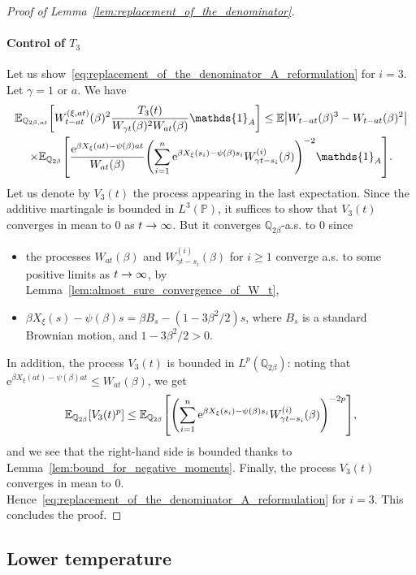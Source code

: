 \documentclass[AHL,Unicode,longabstracts,published]{cedram}
\newcommand{\e}{\mathrm{e}}
\newcommand{\E}{\mathbb{E}}
\renewcommand{\P}{\mathbb{P}}
\newcommand{\Q}{\mathbb{Q}}
\newcommand\1{\mathds{1}}
\let\originalleft\left
\let\originalright\right
\renewcommand{\left}{\mathopen{}\mathclose\bgroup\originalleft}
\renewcommand{\right}{\aftergroup\egroup\originalright}
\renewcommand*{\to}{\mathchoice{\longrightarrow}{\rightarrow}{\rightarrow}{\rightarrow}}
\begin{document}
\begin{proof}[Proof of Lemma~\ref{lem:replacement_of_the_denominator}]
\paragraph*{Control of $T_3$}
Let us show~\eqref{eq:replacement_of_the_denominator_A_reformulation} for $i = 3$. Let $\gamma = 1 \text{ or } a$. We have
\begin{multline*}
\E_{\Q_{2\beta, at}} \left[W_{t - at}^{(\xi, at)}(\beta)^2 \frac{T_3(t)}{W_{\gamma t}(\beta)^2 W_{at}(\beta)} \1_A \right]  \leq \E \left| W_{t - at}(\beta)^3 - W_{t - at}(\beta)^2 \right|  \\
\times \E_{\Q_{2\beta}} \left[\frac{\e^{\beta X_\xi(at) - \psi(\beta) at}}{W_{at}(\beta)} \left(\sum_{i = 1}^n \e^{\beta X_\xi(s_i) - \psi(\beta)s_i} W_{\gamma t - s_i}^{(i)}(\beta) \right)^{-2} \1_A \right].
\end{multline*}
Let us denote by $V_3(t)$ the process appearing in the last expectation. Since the additive martingale is bounded in $L^3(\P)$, it suffices to show that $V_3(t)$ converges in mean to $0$ as $t \to \infty$. But it converges $\Q_{2\beta}$-a.s. to $0$ since
\begin{itemize}
\item the processes $W_{at}(\beta)$ and $W_{\gamma t - s_i}^{(i)}(\beta)$ for $i \geq 1$ converge a.s. to some positive limits as $t \to \infty$, by Lemma~\ref{lem:almost_sure_convergence_of_W_t},
\item $\beta X_\xi(s) - \psi(\beta)s = \beta B_s - (1 - 3\beta^2/2)s$, where $B_s$ is a standard Brownian motion, and $1 - 3\beta^2/2>0$.
\end{itemize}
In addition, the process $V_3(t)$ is bounded in $L^p(\Q_{2\beta})$: noting that $\e^{\beta X_\xi(at) - \psi(\beta) at} \leq W_{at}(\beta)$, we get
\begin{equation*}
\E_{\Q_{2\beta}} \left[V_3(t)^p \right] \leq \E_{\Q_{2\beta}} \left[\left(\sum_{i = 1}^n \e^{\beta X_\xi(s_i) - \psi(\beta)s_i} W_{\gamma t - s_i}^{(i)}(\beta) \right)^{-2p} \right],
\end{equation*}
and we see that the right-hand side is bounded thanks to Lemma~\ref{lem:bound_for_negative_moments}. Finally, the process $V_3(t)$ converges in mean to $0$. Hence~\eqref{eq:replacement_of_the_denominator_A_reformulation} for $i = 3$. This concludes the proof.
\end{proof}

\subsection{Lower temperature}
\end{document}
